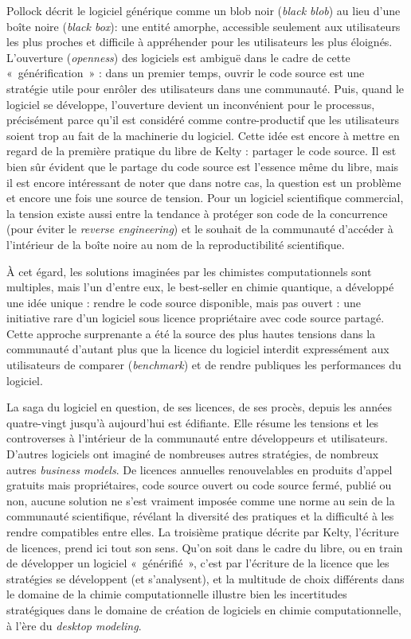 \documentclass{FramateX}
\begin{document}
\begin{refsection}
Pollock décrit le logiciel générique comme un blob noir (\textit{black
blob}) au lieu d'une boîte noire (\textit{black box}): une entité amorphe, accessible seulement aux utilisateurs les plus
proches et difficile à appréhender pour les utilisateurs les plus
éloignés. L'ouverture (\textit{openness}) des
logiciels est ambiguë dans le cadre de cette «~générification~» : dans
un premier temps, ouvrir le code source est une stratégie utile pour
enrôler des utilisateurs dans une communauté. Puis, quand le logiciel
se développe, l'ouverture devient un inconvénient pour
le processus, précisément parce qu'il est considéré
comme contre-productif que les utilisateurs soient trop au fait de la
machinerie du logiciel. Cette idée est encore à mettre en regard de la
première pratique du libre de Kelty : partager le code source. Il est
bien sûr évident que le partage du code source est
l'essence même du libre, mais il est encore
intéressant de noter que dans notre cas, la question est un problème et
encore une fois une source de tension. Pour un logiciel scientifique
commercial, la tension existe aussi entre la tendance à protéger son
code de la concurrence (pour éviter le \textit{reverse
engineering}) et le souhait de la communauté
d'accéder à l'intérieur de la boîte
noire au nom de la reproductibilité scientifique.

À cet égard, les solutions imaginées par les chimistes computationnels
sont multiples, mais l'un d'entre
eux, le best-seller en chimie quantique, a développé une idée unique :
rendre le code source disponible, mais pas ouvert : une initiative rare
d'un logiciel sous licence propriétaire avec code
source partagé. Cette approche surprenante a été la source des plus
hautes tensions dans la communauté d'autant plus que
la licence du logiciel interdit expressément aux utilisateurs de
comparer (\textit{benchmark}) et de rendre publiques les performances
du logiciel.

La saga du logiciel en question, de ses licences, de ses procès, depuis
les années quatre-vingt jusqu'à
aujourd'hui est édifiante. Elle résume les tensions et
les controverses à l'intérieur de la communauté entre
développeurs et utilisateurs. D'autres logiciels ont
imaginé de nombreuses autres stratégies, de nombreux autres
\textit{business models}. De licences annuelles renouvelables en
produits d'appel gratuits mais propriétaires, code
source ouvert ou code source fermé, publié ou non, aucune solution ne
s'est vraiment imposée comme une norme au sein de la
communauté scientifique, révélant la diversité des pratiques et la
difficulté à les rendre compatibles entre elles. La troisième pratique
décrite par Kelty, l'écriture de licences, prend ici
tout son sens. Qu'on soit dans le cadre du libre, ou
en train de développer un logiciel «~générifié~»,
c'est par l'écriture de la licence
que les stratégies se développent (et s'analysent), et
la multitude de choix différents dans le domaine de la chimie
computationnelle illustre bien les incertitudes stratégiques dans le
domaine de création de logiciels en chimie computationnelle, à
l'ère du \textit{desktop modeling}.


\end{refsection}
\end{document}
